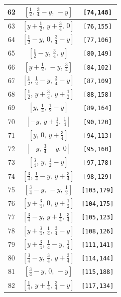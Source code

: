 \documentclass[fleqn,8pt]{jsarticle}
\begin{document}
\begin{longtable}{ccc}
62 & $\left[ \frac{1}{2},\, \frac{3}{4} - y,\, - y \right]$ & {\tt [74,148]} \\ \hline
63 & $\left[ y + \frac{1}{2},\, y + \frac{3}{4},\, 0 \right]$ & {\tt [76,155]} \\ \hline
64 & $\left[ \frac{1}{2} - y,\, 0,\, \frac{3}{4} - y \right]$ & {\tt [77,106]} \\ \hline
65 & $\left[ \frac{1}{2} - y,\, \frac{3}{4},\, y \right]$ & {\tt [80,149]} \\ \hline
66 & $\left[ y + \frac{1}{2},\, - y,\, \frac{3}{4} \right]$ & {\tt [84,102]} \\ \hline
67 & $\left[ \frac{1}{2},\, \frac{1}{2} - y,\, \frac{3}{4} - y \right]$ & {\tt [87,109]} \\ \hline
68 & $\left[ \frac{1}{2},\, y + \frac{3}{4},\, y + \frac{1}{2} \right]$ & {\tt [88,158]} \\ \hline
69 & $\left[ y,\, \frac{1}{4},\, \frac{1}{2} - y \right]$ & {\tt [89,164]} \\ \hline
70 & $\left[ - y,\, y + \frac{1}{2},\, \frac{1}{4} \right]$ & {\tt [90,120]} \\ \hline
71 & $\left[ y,\, 0,\, y + \frac{3}{4} \right]$ & {\tt [94,113]} \\ \hline
72 & $\left[ - y,\, \frac{3}{4} - y,\, 0 \right]$ & {\tt [95,160]} \\ \hline
73 & $\left[ \frac{3}{4},\, y,\, \frac{1}{2} - y \right]$ & {\tt [97,178]} \\ \hline
74 & $\left[ \frac{3}{4},\, \frac{1}{4} - y,\, y + \frac{3}{4} \right]$ & {\tt [98,129]} \\ \hline
75 & $\left[ \frac{3}{4} - y,\, - y,\, \frac{1}{2} \right]$ & {\tt [103,179]} \\ \hline
76 & $\left[ y + \frac{3}{4},\, 0,\, y + \frac{1}{2} \right]$ & {\tt [104,175]} \\ \hline
77 & $\left[ \frac{3}{4} - y,\, y + \frac{1}{4},\, \frac{3}{4} \right]$ & {\tt [105,123]} \\ \hline
78 & $\left[ y + \frac{3}{4},\, \frac{1}{4},\, \frac{3}{4} - y \right]$ & {\tt [108,126]} \\ \hline
79 & $\left[ y + \frac{3}{4},\, \frac{1}{4} - y,\, \frac{1}{4} \right]$ & {\tt [111,141]} \\ \hline
80 & $\left[ \frac{3}{4} - y,\, \frac{3}{4},\, y + \frac{3}{4} \right]$ & {\tt [114,144]} \\ \hline
81 & $\left[ \frac{3}{4} - y,\, 0,\, - y \right]$ & {\tt [115,188]} \\ \hline
82 & $\left[ \frac{1}{4},\, y + \frac{1}{4},\, \frac{3}{4} - y \right]$ & {\tt [117,134]} \\ \hline

\end{longtable}
\end{document}
